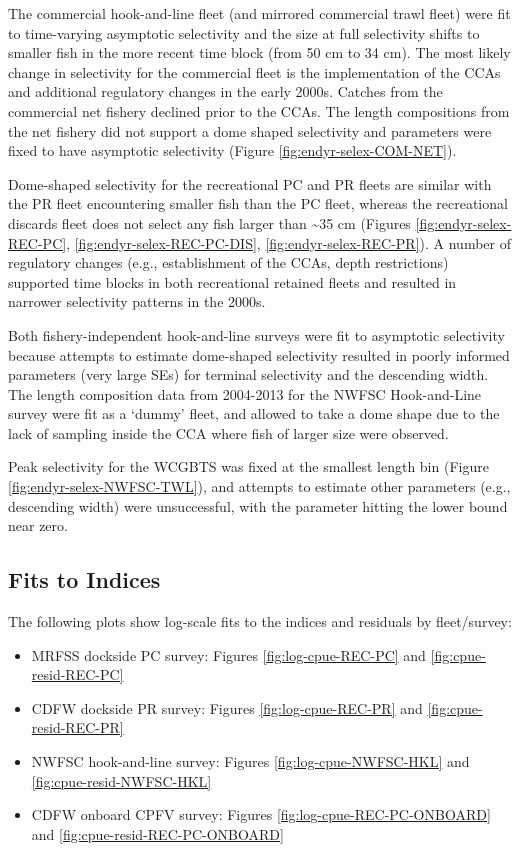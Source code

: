 \documentclass[
  english,
  a4paper,
]{article}
\providecommand{\tightlist}{%
  \setlength{\itemsep}{0pt}\setlength{\parskip}{0pt}}
\begin{document}
The commercial hook-and-line fleet (and mirrored commercial trawl fleet) were fit to time-varying asymptotic selectivity and the size at full selectivity shifts to smaller fish in the more recent time block (from 50 cm to 34 cm). The most likely change in selectivity for the commercial fleet is the implementation of the CCAs and additional regulatory changes in the early 2000s. Catches from the commercial net fishery declined prior to the CCAs. The length compositions from the net fishery did not support a dome shaped selectivity and parameters were fixed to have asymptotic selectivity (Figure \ref{fig:endyr-selex-COM-NET}).

Dome-shaped selectivity for the recreational PC and PR fleets are similar with the PR fleet encountering smaller fish than the PC fleet, whereas the recreational discards fleet does not select any fish larger than \textasciitilde35 cm (Figures \ref{fig:endyr-selex-REC-PC}, \ref{fig:endyr-selex-REC-PC-DIS}, \ref{fig:endyr-selex-REC-PR}). A number of regulatory changes (e.g., establishment of the CCAs, depth restrictions) supported time blocks in both recreational retained fleets and resulted in narrower selectivity patterns in the 2000s.

Both fishery-independent hook-and-line surveys were fit to asymptotic selectivity because attempts to estimate dome-shaped selectivity resulted in poorly informed parameters (very large SEs) for terminal selectivity and the descending width. The length composition data from 2004-2013 for the NWFSC Hook-and-Line survey were fit as a `dummy' fleet, and allowed to take a dome shape due to the lack of sampling inside the CCA where fish of larger size were observed.

Peak selectivity for the WCGBTS was fixed at the smallest length bin (Figure \ref{fig:endyr-selex-NWFSC-TWL}), and attempts to estimate other parameters (e.g., descending width) were unsuccessful, with the parameter hitting the lower bound near zero.

\hypertarget{fits-to-indices}{%
\subsection{Fits to Indices}\label{fits-to-indices}}

The following plots show log-scale fits to the indices and residuals by fleet/survey:

\begin{itemize}
\tightlist
\item
  MRFSS dockside PC survey: Figures \ref{fig:log-cpue-REC-PC} and \ref{fig:cpue-resid-REC-PC}
\item
  CDFW dockside PR survey: Figures \ref{fig:log-cpue-REC-PR} and \ref{fig:cpue-resid-REC-PR}
\item
  NWFSC hook-and-line survey: Figures \ref{fig:log-cpue-NWFSC-HKL} and \ref{fig:cpue-resid-NWFSC-HKL}
\item
  CDFW onboard CPFV survey: Figures \ref{fig:log-cpue-REC-PC-ONBOARD} and \ref{fig:cpue-resid-REC-PC-ONBOARD}
\end{itemize}
\end{document}
